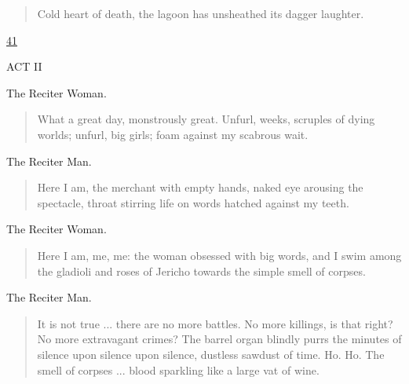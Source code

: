 \documentclass[letterpaper,article,12pt,oneside,notitlepage]{memoir}
\begin{document}
\begin{verse}
Cold heart of death, the lagoon has unsheathed its dagger laughter. \\
\end{verse}

\clearpage

\href{http://cesaire.elotroalex.com/chiens/chiens/p041.html}{41}

\begin{center}ACT II\end{center}
\vspace{1cm}

\begin{center}The Reciter Woman.\end{center}

\begin{verse}
What a great day, monstrously great. Unfurl, weeks, scruples of dying worlds; unfurl, big girls; foam against my scabrous wait. \\
\end{verse}

\begin{center}The Reciter Man.\end{center}

\begin{verse}
Here I am, the merchant with empty hands, naked eye arousing the spectacle, throat stirring life on words hatched against my teeth. \\
\end{verse}

\begin{center}The Reciter Woman.\end{center}

\begin{verse}
Here I am, me, me: the woman obsessed with big words, and I swim among the gladioli and roses of Jericho towards the simple smell of corpses. \\
\end{verse}

\begin{center}The Reciter Man.\end{center}

\begin{verse}
It is not true ... there are no more battles. No more killings, is that right? No more extravagant crimes? The barrel organ blindly purrs the minutes of silence upon silence upon silence, dustless sawdust of time. Ho. Ho. The smell of corpses ... blood sparkling like a large vat of wine. \\
\end{verse}
\end{document}
